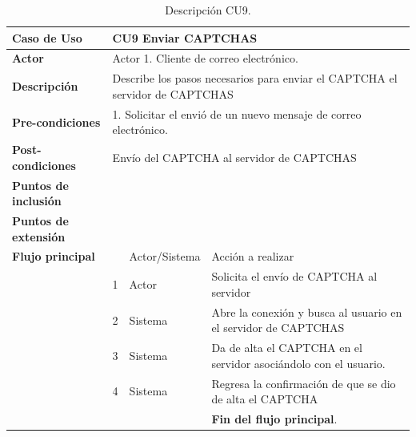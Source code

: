 \documentclass[12pt,oneside,onecolumn,openany]{report}
\begin{document}
\begin{table}[H]
 \centering
   {
     \begin{tabular}{| p{} | p{} |p{4cm}|p{5cm}|}
     \hline
     \textbf{Caso de Uso} &\multicolumn{3}{|l|}{CU9 Enviar CAPTCHAS}\\
     \hline
     \textbf{Actor} & \multicolumn{3}{|l|}{Actor 1. Cliente de correo electrónico.}\\
     \hline
     \textbf{Descripción} & \multicolumn{3}{|p{10cm}|}{Describe los pasos necesarios para enviar el CAPTCHA el servidor de CAPTCHAS}\\
     \hline
     \textbf{Pre-condiciones} & \multicolumn{3}{|l|}{1. Solicitar el envió de un nuevo mensaje de correo electrónico.}\\
     \hline
     \textbf{Post-condiciones} & \multicolumn{3}{|l|}{Envío del CAPTCHA al servidor de CAPTCHAS}\\
     \hline
     \textbf{Puntos de inclusión} & \multicolumn{3}{|l|}{}\\
     \hline
     \textbf{Puntos de extensión} & \multicolumn{3}{|l|}{}\\
     \hline
     \textbf{Flujo principal} & & Actor/Sistema & Acción a realizar\\
     \hline
     & 1 & Actor & Solicita el envío de CAPTCHA al servidor\\
     \hline
     & 2 & Sistema & Abre la conexión y busca al usuario en el servidor de CAPTCHAS\\
     \hline
     & 3 & Sistema & Da de alta el CAPTCHA en el servidor asociándolo con el usuario.\\
     \hline
     & 4 & Sistema & Regresa la confirmación de que se dio de alta el CAPTCHA\\
     \hline
     & & & \textbf{Fin del flujo principal}.\\
         
     \end{tabular}
    }
    \caption{Descripción CU9.}
    \label{tabla:CU9}
\end{table}


\pagebreak
\end{document}
